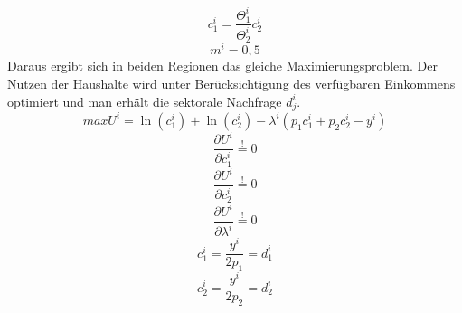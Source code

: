 \begin{equation} c_1^i=\frac{\Theta_1^i}{\Theta_2^i}c_2^i\end{equation}
\begin{equation} m^i=0,5\end{equation}
Daraus ergibt sich in beiden Regionen das gleiche Maximierungsproblem. Der Nutzen der Haushalte wird unter Ber{\"u}cksichtigung des verf{\"u}gbaren Einkommens optimiert und man erh{\"a}lt die sektorale Nachfrage $d_j^i$. 
\begin{equation} maxU^i=\ln(c^i_1)+\ln(c^i_2)-\lambda^i (p_1c^i_1+p_2c^i_2-y^i)\end{equation}
\begin{equation}\frac{\partial U^i}{\partial c^i_1}\overset{!}{=}0\end{equation}
\begin{equation}\frac{\partial U^i}{\partial c^i_2}\overset{!}{=}0\end{equation}
\begin{equation}\frac{\partial U^i}{\partial \lambda^i}\overset{!}{=}0\end{equation}
\begin{equation} c^i_1=\frac{y^i}{2p_1}=d^i_1\end{equation}
\begin{equation} c^i_2=\frac{y^i}{2p_2}=d^i_2\end{equation}

